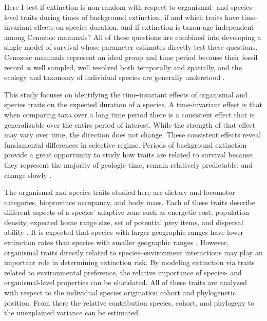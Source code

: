 \documentclass{nature}
\begin{document}
Here I test if extinction is non-random with respect to organismal- and species-level traits during times of background extinction, if and which traits have time-invariant effects on species duration, and if extinction is taxon-age independent among Cenozoic mammals? All of these questions are combined into developing a single model of survival whose parameter estimates directly test these questions. 
Cenozoic mammals represent an ideal group and time period because their fossil record is well sampled, well resolved both temporally and spatially, and the ecology and taxonomy of individual species are generally understood \cite{Alroy2009,Liow2008,Smith2004,Quental2013,Simpson1944,Tomiya2013,Marcot2014}. 

This study focuses on identifying the time-invariant effects of organismal and species traits on the expected duration of a species. A time-invariant effect is that when comparing taxa over a long time period there is a consistent effect that is generalizable over the entire period of interest. While the strength of that effect may vary over time, the direction does not change. These consistent effects reveal fundamental differences in selective regime. Periods of background extinction provide a great opportunity to study how traits are related to survival because they represent the majority of geologic time, remain relatively predictable, and change slowly \cite{Jablonski1986,Raup1988}. 

The organismal and species traits studied here are dietary and locomotor categories, bioprovince occupancy, and body mass. Each of these traits describe different aspects of a species' adaptive zone such as energetic cost, population density, expected home range size, set of potential prey items, and dispersal ability \cite{Smith2004,Jernvall2004}. It is expected that species with larger geographic ranges have lower extinction rates than species with smaller geographic ranges \cite{Jablonski1986,Roy2009c}. However, organismal traits directly related to species--environment interactions may play an important role in determining extinction risk. By modeling extinction via traits related to environmental preference, the relative importance of species- and organismal-level properties can be elucidated. All of these traits are analyzed with respect to the individual species origination cohort and phylogenetic position. From there the relative contribution species, cohort, and phylogeny to the unexplained variance can be estimated. 
\end{document}
